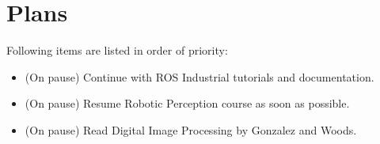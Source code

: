 \documentclass[11pt]{article}
\begin{document}
\section{Plans}
Following items are listed in order of priority:

\begin{itemize}

	\item (On pause) Continue with ROS Industrial tutorials and documentation.

	\item (On pause) Resume Robotic Perception course as soon as possible.

	\item (On pause) Read Digital Image Processing by Gonzalez and Woods.

\end{itemize}



\newpage


\end{document}
